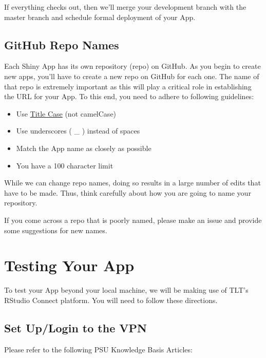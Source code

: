 \documentclass[
]{book}
\providecommand{\tightlist}{%
  \setlength{\itemsep}{0pt}\setlength{\parskip}{0pt}}
\begin{document}
If everything checks out, then we'll merge your development branch with the master branch and schedule formal deployment of your App.

\hypertarget{repo-naming}{%
\subsection{GitHub Repo Names}\label{repo-naming}}

Each Shiny App has its own repository (repo) on GitHub. As you begin to create new apps, you'll have to create a new repo on GitHub for each one. The name of that repo is extremely important as this will play a critical role in establishing the URL for your App. To this end, you need to adhere to following guidelines:

\begin{itemize}
\tightlist
\item
  Use \href{https://en.wikipedia.org/wiki/Letter_case\#Title_case}{Title Case} (not camelCase)
\item
  Use underscores ( \_ ) instead of spaces
\item
  Match the App name as closely as possible
\item
  You have a 100 character limit
\end{itemize}

While we can change repo names, doing so results in a large number of edits that have to be made. Thus, think carefully about how you are going to name your repository.

If you come across a repo that is poorly named, please make an issue and provide some suggestions for new names.

\hypertarget{testing}{%
\section{Testing Your App}\label{testing}}

To test your App beyond your local machine, we will be making use of TLT's RStudio Connect platform. You will need to follow these directions.

\hypertarget{set-uplogin-to-the-vpn}{%
\subsection{Set Up/Login to the VPN}\label{set-uplogin-to-the-vpn}}

Please refer to the following PSU Knowledge Basis Articles:
\end{document}

